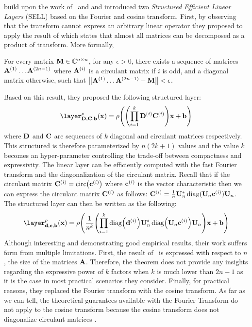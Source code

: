 \citet{moczulski2016acdc} build upon the work of~\citet{cheng2015exploration} and \citet{huhtanen2015factoring} and introduced two \emph{Structured Efficient Linear Layers} (SELL) based on the Fourier and cosine transform.
First, by observing that the \DC transform cannot express an arbitrary linear operator they proposed to apply the result of \citet{huhtanen2015factoring} which states that almost all matrices can be decomposed as a product of \DC transform.
More formally, 
\begin{theorem}
  For every matrix $\mathbf{M} \in \mathbb{C}^{n \times n}$, for any $\epsilon > 0$, there exists a sequence of matrices $\mathbf{A}^{(1)} \ldots \mathbf{A}^{(2n-1)}$ where $\mathbf{A}^{(i)}$ is a circulant matrix if $i$ is odd, and a diagonal matrix otherwise, such that $\norm{\mathbf{A}^{(1)} \ldots \mathbf{A}^{(2n-1)} - \mathbf{M}} < \epsilon$.
  \label{theorem:ch3-huhtanen}
\end{theorem}
\noindent
Based on this result, they proposed the following structured layer:
\begin{equation}
  \layer^\act_{\Dmat, \Cmat, \bvec} (\xvec) = \act \left( \left(\prod_{i = 1}^{k} \Dmat^{(i)} \Cmat^{(i)} \right) \xvec + \bvec \right)
\end{equation}
where $\mathbf{D}$ and $\mathbf{C}$ are sequences of $k$ diagonal and circulant matrices respectively.
This structured is therefore parameterized by $n(2k+1)$ values and the value $k$ becomes an hyper-parameter controlling the trade-off between compactness and expressivity. 
The linear layer can be efficiently computed with the fast Fourier transform and the diagonalization of the circulant matrix. 
Recall that if the circulant matrix $\Cmat^{(i)} =  \circulant\left(\cvec^{(i)}\right)$ where $\mathbf{c}^{(i)}$ is the vector characteristic then we can express the circulant matrix $\mathbf{C}^{(i)}$ as follows: $\mathbf{C}^{(i)} = \frac{1}{n} \mathbf{U}_n^* \operatorname*{diag}(\mathbf{U}_n \mathbf{c}^{(i)}) \mathbf{U}_n$.
The structured layer can then be written as the following:
\begin{equation}
  \layer^\act_{\dvec, \cvec, \bvec} (\xvec) = \act \left(\frac{1}{n^k} \left(\prod_{i = 1}^{k} \diag\left(\dvec^{(i)}\right) \Umat_n^* \diag\left(\Umat_n \cvec^{(i)}\right) \Umat_n \right) \xvec + \bvec \right)
\end{equation}
\noindent
Although interesting and demonstrating good empirical results, their work suffers form from multiple limitations. 
First, the result of~\citet{huhtanen2015factoring} is expressed with respect to $n$, the size of the matrices $\mathbf{A}$.
Therefore, the theorem does not provide any insights regarding the expressive power of $k$ factors when $k$ is much lower than $2n-1$ as it is the case in most practical scenarios they consider.
Finally, for practical reasons, they replaced the Fourier transform with the cosine transform.
As far as we can tell, the theoretical guarantees available with the Fourier Transform do not apply to the cosine transform because the cosine transform does not diagonalize circulant matrices \cite{sanchez1995diagonalizing}.



